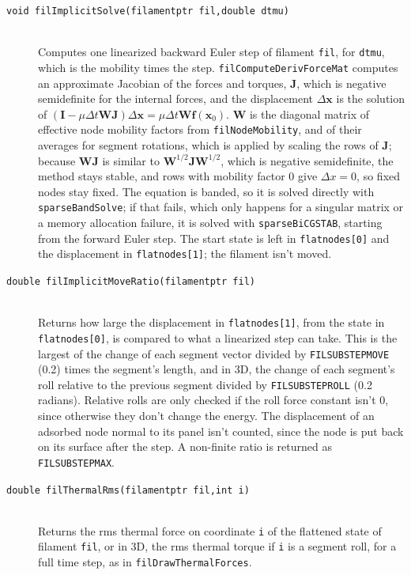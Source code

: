 \documentclass {scrbook}
\newcommand {\ttt} {\texttt}
\begin{document}
\begin{description}
\item[\ttt{void filImplicitSolve(filamentptr fil,double dtmu)}]
\hfill \\
Computes one linearized backward Euler step of filament \ttt{fil}, for \ttt{dtmu}, which is the mobility times the step. \ttt{filComputeDerivForceMat} computes an approximate Jacobian of the forces and torques, $\bm{J}$, which is negative semidefinite for the internal forces, and the displacement $\Delta\bm{x}$ is the solution of $(\bm{I}-\mu\Delta t\bm{W}\bm{J})\Delta\bm{x}=\mu\Delta t\bm{W}\bm{f}(\bm{x}_0)$. $\bm{W}$ is the diagonal matrix of effective node mobility factors from \ttt{filNodeMobility}, and of their averages for segment rotations, which is applied by scaling the rows of $\bm{J}$; because $\bm{W}\bm{J}$ is similar to $\bm{W}^{1/2}\bm{J}\bm{W}^{1/2}$, which is negative semidefinite, the method stays stable, and rows with mobility factor 0 give $\Delta x=0$, so fixed nodes stay fixed. The equation is banded, so it is solved directly with \ttt{sparseBandSolve}; if that fails, which only happens for a singular matrix or a memory allocation failure, it is solved with \ttt{sparseBiCGSTAB}, starting from the forward Euler step. The start state is left in \ttt{flatnodes[0]} and the displacement in \ttt{flatnodes[1]}; the filament isn't moved.

\item[\ttt{double filImplicitMoveRatio(filamentptr fil)}]
\hfill \\
Returns how large the displacement in \ttt{flatnodes[1]}, from the state in \ttt{flatnodes[0]}, is compared to what a linearized step can take. This is the largest of the change of each segment vector divided by \ttt{FILSUBSTEPMOVE} (0.2) times the segment's length, and in 3D, the change of each segment's roll relative to the previous segment divided by \ttt{FILSUBSTEPROLL} (0.2 radians). Relative rolls are only checked if the roll force constant isn't 0, since otherwise they don't change the energy. The displacement of an adsorbed node normal to its panel isn't counted, since the node is put back on its surface after the step. A non-finite ratio is returned as \ttt{FILSUBSTEPMAX}.

\item[\ttt{double filThermalRms(filamentptr fil,int i)}]
\hfill \\
Returns the rms thermal force on coordinate \ttt{i} of the flattened state of filament \ttt{fil}, or in 3D, the rms thermal torque if \ttt{i} is a segment roll, for a full time step, as in \ttt{filDrawThermalForces}.


\end{description}
\end{document}
